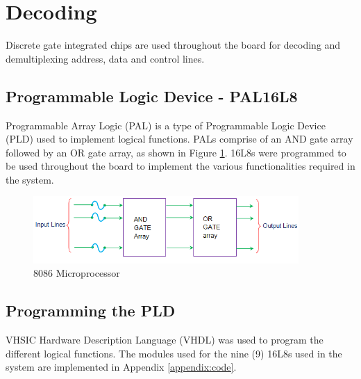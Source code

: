 \section{Decoding}
Discrete gate integrated chips are used throughout the board for decoding and demultiplexing address, data and control lines.

    \subsection{Programmable Logic Device - PAL16L8}
    Programmable Array Logic (PAL) is a type of Programmable Logic Device (PLD) used to implement logical functions. \cite{pal} PALs comprise of an AND gate array followed by an OR gate array, as shown in Figure \ref{fig:pal}.\n
    16L8s were programmed to be used throughout the board to implement the various functionalities required in the system.

        \begin{figure}[ht]
            \begin{center}
                \includegraphics[width=0.9\textwidth]{figures/pal.png}
                \caption{8086 Microprocessor} \label{fig:pal}
            \end{center}
        \end{figure}


    \subsection{Programming the PLD}
    VHSIC Hardware Description Language (VHDL) was used to program the different logical functions. The modules used for the nine (9) 16L8s used in the system are implemented in Appendix \ref{appendix:code}.

